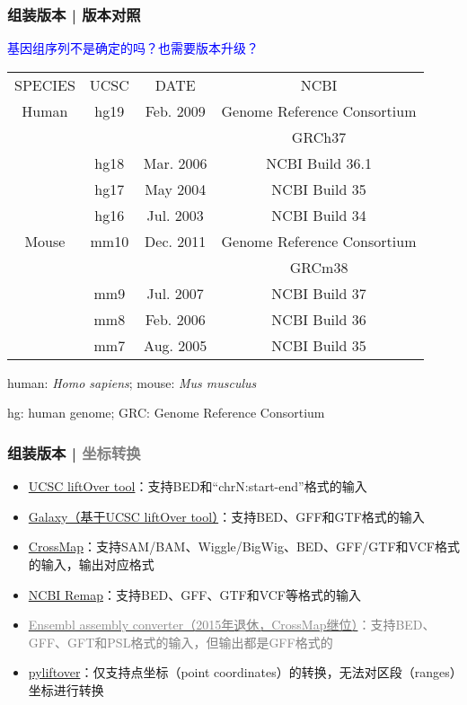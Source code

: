 \begin{frame}
  \frametitle{组装版本 | \alert{版本对照}}
  \begin{center}
    \textcolor{blue}{基因组序列不是确定的吗？也需要版本升级？}
  \end{center}
  \pause
  \begin{table}
    \centering
    \begin{tabular}{cccc}
      \hline
      \rowcolor{blue!50} SPECIES & UCSC & DATE & NCBI\\
      Human & hg19 & Feb. 2009 & Genome Reference Consortium\\
       & & & GRCh37\\
       & hg18 & Mar. 2006 & NCBI Build 36.1\\
       & hg17 & May 2004 & NCBI Build 35\\
       & hg16 & Jul. 2003 & NCBI Build 34\\
      \hline
      Mouse & mm10 & Dec. 2011 & Genome Reference Consortium\\
       & & & GRCm38\\
       & mm9 & Jul. 2007 & NCBI Build 37\\
       & mm8 & Feb. 2006 & NCBI Build 36\\
       & mm7 & Aug. 2005 & NCBI Build 35\\
      \hline
    \end{tabular}
  \end{table}
  \pause
  \begin{center}
    human: \textit{Homo sapiens}; mouse: \textit{\alert{M}us \alert{m}usculus}

    hg: \alert{h}uman \alert{g}enome; GRC: \alert{G}enome \alert{R}eference \alert{C}onsortium
  \end{center}
\end{frame}

\begin{frame}
  \frametitle{组装版本 | \textcolor{gray}{坐标转换}}
  \begin{itemize}
    \item \href{http://genome.ucsc.edu/cgi-bin/hgLiftOver}{UCSC liftOver tool}：支持BED和“chrN:start-end”格式的输入
    \item \href{https://usegalaxy.org/}{Galaxy（基于UCSC liftOver tool）}：支持BED、GFF和GTF格式的输入
    \item \href{http://crossmap.sourceforge.net/}{CrossMap}：支持SAM/BAM、Wiggle/BigWig、BED、GFF/GTF和VCF格式的输入，输出对应格式
    \item \href{http://www.ncbi.nlm.nih.gov/genome/tools/remap}{NCBI Remap}：支持BED、GFF、GTF和VCF等格式的输入
    \item \href{http://asia.ensembl.org/Homo\_sapiens/UserData/SelectFeatures}{\textcolor{gray}{Ensembl assembly converter（2015年退休，CrossMap继位）}}\textcolor{gray}{：支持BED、GFF、GFT和PSL格式的输入，但输出都是GFF格式的}
    \item \href{https://pypi.python.org/pypi/pyliftover}{pyliftover}：仅支持点坐标（point coordinates）的转换，无法对区段（ranges）坐标进行转换
  \end{itemize}
\end{frame}

